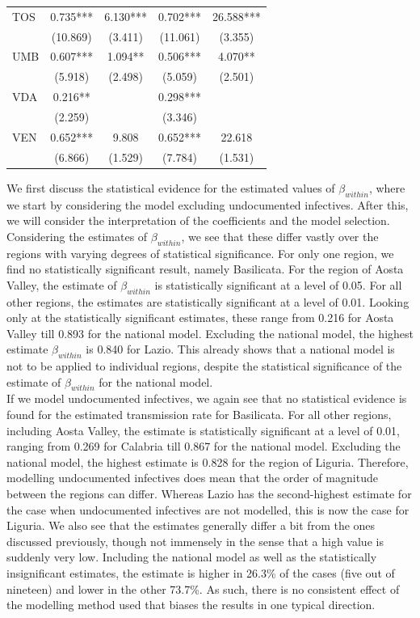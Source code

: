 \documentclass[12pt]{article}
\begin{document}
\begin{longtable}{@{}lcccc@{}}
        TOS & 0.735*** & 6.130*** & 0.702*** & 26.588*** \\ 
         & (10.869) & (3.411) & (11.061) & (3.355) \\ 
        UMB & 0.607*** & 1.094** & 0.506*** & 4.070** \\ 
         & (5.918) & (2.498) & (5.059) & (2.501) \\ 
        VDA & 0.216** & & 0.298*** &  \\ 
         & (2.259) & & (3.346) &  \\ 
        VEN & 0.652*** & 9.808 & 0.652*** & 22.618 \\ 
         & (6.866) & (1.529) & (7.784) & (1.531) \\* \bottomrule
	\end{longtable}

    We first discuss the statistical evidence for the estimated values of $\beta_{within}$, where we start by considering the model excluding undocumented infectives. After this, we will consider the interpretation of the coefficients and the model selection. Considering the estimates of $\beta_{within}$, we see that these differ vastly over the regions with varying degrees of statistical significance. For only one region, we find no statistically significant result, namely Basilicata. For the region of Aosta Valley, the estimate of $\beta_{within}$ is statistically significant at a level of 0.05. For all other regions, the estimates are statistically significant at a level of 0.01. Looking only at the statistically significant estimates, these range from 0.216 for Aosta Valley till 0.893 for the national model. Excluding the national model, the highest estimate $\beta_{within}$ is 0.840 for Lazio. This already shows that a national model is not to be applied to individual regions, despite the statistical significance of the estimate of $\beta_{within}$ for the national model. \\

    If we model undocumented infectives, we again see that no statistical evidence is found for the estimated transmission rate for Basilicata. For all other regions, including Aosta Valley, the estimate is statistically significant at a level of 0.01, ranging from 0.269 for Calabria till 0.867 for the national model. Excluding the national model, the highest estimate is 0.828 for the region of Liguria. Therefore, modelling undocumented infectives does mean that the order of magnitude between the regions can differ. Whereas Lazio has the second-highest estimate for the case when undocumented infectives are not modelled, this is now the case for Liguria. We also see that the estimates generally differ a bit from the ones discussed previously, though not immensely in the sense that a high value is suddenly very low. Including the national model as well as the statistically insignificant estimates, the estimate is higher in 26.3\% of the cases (five out of nineteen) and lower in the other 73.7\%. As such, there is no consistent effect of the modelling method used that biases the results in one typical direction. \\
\end{document}
